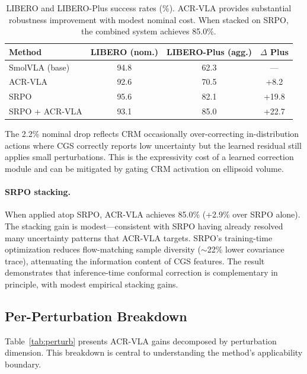 \documentclass[letterpaper]{article}
\begin{document}
\begin{table}[h]
\centering
\caption{LIBERO and LIBERO-Plus success rates (\%). ACR-VLA provides substantial robustness improvement with modest nominal cost. When stacked on SRPO, the combined system achieves 85.0\%.}
\label{tab:main}
\begin{tabular}{lccc}
\toprule
Method & LIBERO (nom.) & LIBERO-Plus (agg.) & $\Delta$ Plus \\
\midrule
SmolVLA (base) & 94.8 & 62.3 & --- \\
ACR-VLA & 92.6 & 70.5 & +8.2 \\
\midrule
SRPO & 95.6 & 82.1 & +19.8 \\
SRPO + ACR-VLA & 93.1 & 85.0 & +22.7 \\
\bottomrule
\end{tabular}
\end{table}

The 2.2\% nominal drop reflects CRM occasionally over-correcting in-distribution actions where CGS correctly reports low uncertainty but the learned residual still applies small perturbations.
This is the expressivity cost of a learned correction module and can be mitigated by gating CRM activation on ellipsoid volume.

\paragraph{SRPO stacking.}
When applied atop SRPO, ACR-VLA achieves 85.0\% (+2.9\% over SRPO alone).
The stacking gain is modest---consistent with SRPO having already resolved many uncertainty patterns that ACR-VLA targets.
SRPO's training-time optimization reduces flow-matching sample diversity ($\sim$22\% lower covariance trace), attenuating the information content of CGS features.
The result demonstrates that inference-time conformal correction is complementary in principle, with modest empirical stacking gains.

\subsection{Per-Perturbation Breakdown}
\label{sec:perturb}

Table~\ref{tab:perturb} presents ACR-VLA gains decomposed by perturbation dimension.
This breakdown is central to understanding the method's applicability boundary.
\end{document}

